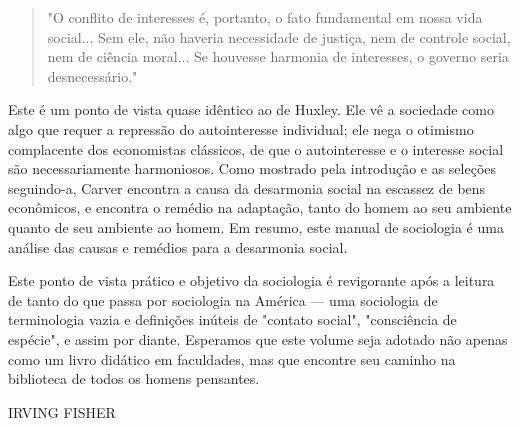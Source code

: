 \documentclass[12pt]{article}
\begin{document}
\begin{quote}
"O conflito de interesses é, portanto, o fato fundamental em nossa vida social... Sem ele, não haveria necessidade de justiça, nem de controle social, nem de ciência moral... Se houvesse harmonia de interesses, o governo seria desnecessário."
\end{quote}

Este é um ponto de vista quase idêntico ao de Huxley. Ele vê a sociedade como algo que requer a repressão do autointeresse individual; ele nega o otimismo complacente dos economistas clássicos, de que o autointeresse e o interesse social são necessariamente harmoniosos. Como mostrado pela introdução e as seleções seguindo-a, Carver encontra a causa da desarmonia social na escassez de bens econômicos, e encontra o remédio na adaptação, tanto do homem ao seu ambiente quanto de seu ambiente ao homem. Em resumo, este manual de sociologia é uma análise das causas e remédios para a desarmonia social.

Este ponto de vista prático e objetivo da sociologia é revigorante após a leitura de tanto do que passa por sociologia na América — uma sociologia de terminologia vazia e definições inúteis de "contato social", "consciência de espécie", e assim por diante. Esperamos que este volume seja adotado não apenas como um livro didático em faculdades, mas que encontre seu caminho na biblioteca de todos os homens pensantes.

\bigskip
\begin{flushright}
IRVING FISHER
\end{flushright}
\end{document}

